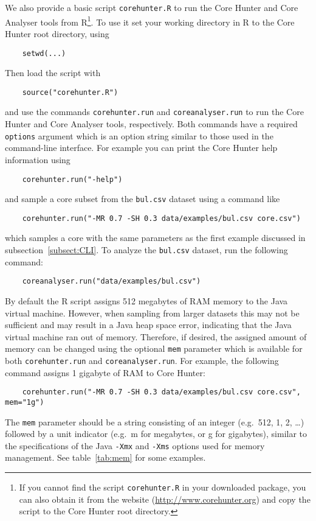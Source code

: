 \documentclass[a4paper, titlepage, 11pt]{article}
\begin{document}
We also provide a basic script \texttt{corehunter.R} to run the Core Hunter and Core Analyser tools from R\footnote{If you cannot find the script \texttt{corehunter.R} in your downloaded package, you can also obtain it from the website (\url{http://www.corehunter.org}) and copy the script to the Core Hunter root directory.}. To use it set your working directory in R to the Core Hunter root directory, using
\begin{verbatim}
    setwd(...)
\end{verbatim}
Then load the script with
\begin{verbatim}
    source("corehunter.R")
\end{verbatim}
and use the commands \texttt{corehunter.run} and \texttt{coreanalyser.run} to run the Core Hunter and Core Analyser tools, respectively. Both commands have a required \texttt{options} argument which is an option string similar to those used in the command-line interface. For example you can print the Core Hunter help information using
\begin{verbatim}
    corehunter.run("-help")
\end{verbatim}
and sample a core subset from the \texttt{bul.csv} dataset using a command like
\begin{verbatim}
    corehunter.run("-MR 0.7 -SH 0.3 data/examples/bul.csv core.csv")
\end{verbatim}
which samples a core with the same parameters as the first example discussed in subsection~\ref{subsect:CLI}. To analyze the \texttt{bul.csv} dataset, run the following command:
\begin{verbatim}
    coreanalyser.run("data/examples/bul.csv")
\end{verbatim}
By default the R script assigns 512 megabytes of RAM memory to the Java virtual machine. However, when sampling from larger datasets this may not be sufficient and may result in a Java heap space error, indicating that the Java virtual machine ran out of memory. Therefore, if desired, the assigned amount of memory can be changed using the optional \texttt{mem} parameter which is available for both \texttt{corehunter.run} and \texttt{coreanalyser.run}. For example, the following command assigns 1 gigabyte of RAM to Core Hunter:
\begin{verbatim}
    corehunter.run("-MR 0.7 -SH 0.3 data/examples/bul.csv core.csv", mem="1g")
\end{verbatim}
The \texttt{mem} parameter should be a string consisting of an integer (e.g.\ 512, 1, 2, \ldots) followed by a unit indicator (e.g.\ m for megabytes, or g for gigabytes), similar to the specifications of the Java \texttt{-Xmx} and \texttt{-Xms} options used for memory management. See table~\ref{tab:mem} for some examples.
\end{document}
